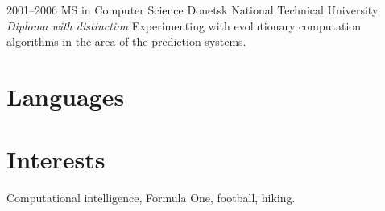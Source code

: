 \documentclass[11pt,a4paper,roman]{moderncv}
\begin{document}
\cventry
    {2001--2006}
    {MS in Computer Science}
    {Donetsk National Technical University}
    {}
    {\newline\textit{Diploma with distinction}}
    {Experimenting with evolutionary computation algorithms in the area of the
    prediction systems.}


\medskip
\section{Languages}


\medskip
\section{Interests}

\cvline
    {}{Computational intelligence, Formula One, football, hiking.}


\medskip
\nocite{*}
\renewcommand{\bibliographyitemlabel}{[\arabic{enumiv}]}


\end{document}
